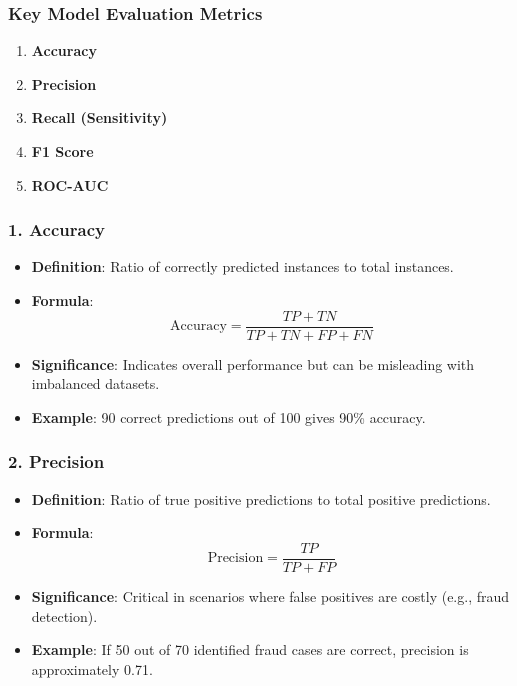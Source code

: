 \documentclass[aspectratio=169]{beamer}
\begin{document}
\begin{frame}[fragile]
    \frametitle{Key Model Evaluation Metrics}
    \begin{enumerate}
        \item \textbf{Accuracy}
        \item \textbf{Precision}
        \item \textbf{Recall (Sensitivity)}
        \item \textbf{F1 Score}
        \item \textbf{ROC-AUC}
    \end{enumerate}
\end{frame}

\begin{frame}[fragile]
    \frametitle{1. Accuracy}
    \begin{itemize}
        \item \textbf{Definition}: Ratio of correctly predicted instances to total instances.
        \item \textbf{Formula}:
        \begin{equation}
        \text{Accuracy} = \frac{TP + TN}{TP + TN + FP + FN}
        \end{equation}
        \item \textbf{Significance}: Indicates overall performance but can be misleading with imbalanced datasets.
        \item \textbf{Example}: 90 correct predictions out of 100 gives 90\% accuracy.
    \end{itemize}
\end{frame}

\begin{frame}[fragile]
    \frametitle{2. Precision}
    \begin{itemize}
        \item \textbf{Definition}: Ratio of true positive predictions to total positive predictions.
        \item \textbf{Formula}:
        \begin{equation}
        \text{Precision} = \frac{TP}{TP + FP}
        \end{equation}
        \item \textbf{Significance}: Critical in scenarios where false positives are costly (e.g., fraud detection).
        \item \textbf{Example}: If 50 out of 70 identified fraud cases are correct, precision is approximately 0.71.
    \end{itemize}
\end{frame}
\end{document}
